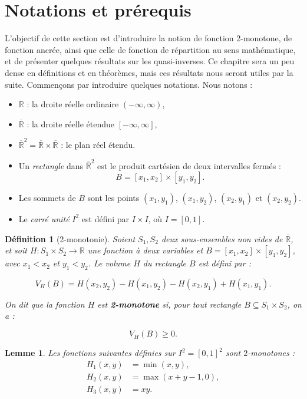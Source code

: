 \documentclass[a4paper,11pt]{amsbook}
\numberwithin{equation}{chapter}
\newtheorem{lemme}	    [theoreme]	 {Lemme}
\newtheorem{definition}	[theoreme]   {Définition}
\theoremstyle{definition}
\begin{document}
\section{Notations et prérequis} 
L’objectif de cette section est d’introduire la notion de fonction 2-monotone, de fonction ancrée, ainsi que celle de fonction de répartition au sens mathématique, et de présenter quelques résultats sur les quasi-inverses.
Ce chapitre sera un peu dense en définitions et en théorèmes, mais ces résultats nous seront utiles par la suite. Commençons par introduire quelques notations.
Nous notons :
\begin{itemize}
    \item $\mathbb{R}$ : la droite réelle ordinaire $(-\infty, \infty)$,
    \item $\overline{\mathbb{R}}$ : la droite réelle étendue $[-\infty, \infty]$,
    \item $\overline{\mathbb{R}}^2 = \overline{\mathbb{R}} \times \overline{\mathbb{R}}$ : le plan réel étendu.
    \item Un \textit{rectangle} dans $\overline{\mathbb{R}}^2$ est le produit cartésien de deux intervalles fermés :
\[
B = [x_1, x_2] \times [y_1, y_2].
\]
    \item Les sommets de $B$ sont les points $(x_1, y_1)$, $(x_1, y_2)$, $(x_2, y_1)$ et $(x_2, y_2)$.
    \item Le \textit{carré unité} $I^2$ est défini par $I \times I$, où $I = [0,1]$.  
\end{itemize}

\begin{definition}[2-monotonie]\label{def:2-monotonie}
Soient \( S_1, S_2 \) deux sous-ensembles non vides de \( \overline{\mathbb{R}} \), et soit \( H : S_1 \times S_2 \to \mathbb{R} \) une fonction à deux variables et \( B = [x_1, x_2] \times [y_1, y_2] \), avec \( x_1 < x_2 \) et \( y_1 < y_2 \).
Le \textit{volume \( H \)} du rectangle \( B \) est défini par :

\[
V_H(B) = H(x_2, y_2) - H(x_1, y_2) - H(x_2, y_1) + H(x_1, y_1).
\]

On dit que la fonction \( H \) est \textbf{2-monotone} si, pour tout rectangle \( B \subseteq S_1 \times S_2\), on a :

\[
V_H(B) \geq 0.
\]

\end{definition}

\begin{lemme}\label{lem:premier}
Les fonctions suivantes définies sur \( I^2 = [0,1]^2 \) sont \(2\)-monotones :
\[
\begin{aligned}
H_1(x, y) &= \min(x, y), \\
H_2(x, y) &= \max(x + y - 1, 0), \\
H_3(x, y) &= x y.
\end{aligned}
\]
\end{lemme}
\end{document}
